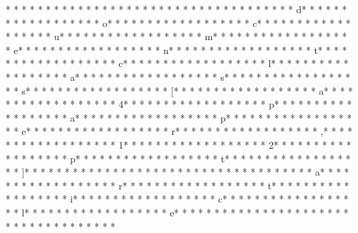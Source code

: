 * * *  * * *  * * *  *  * * *  *  * * *  * 
* * *  * * *  * * *  *  * * *  *  * * *  * d* * *  * * *  * * *  *  * * *  *  * * *  * o* * *  * * *  * * *  *  * * *  *  * * *  * c* * *  * * *  * * *  *  * * *  *  * * *  * u* * *  * * *  * * *  *  * * *  *  * * *  * m* * *  * * *  * * *  *  * * *  *  * * *  * e* * *  * * *  * * *  *  * * *  *  * * *  * n* * *  * * *  * * *  *  * * *  *  * * *  * t* * *  * * *  * * *  *  * * *  *  * * *  * c* * *  * * *  * * *  *  * * *  *  * * *  * l* * *  * * *  * * *  *  * * *  *  * * *  * a* * *  * * *  * * *  *  * * *  *  * * *  * s* * *  * * *  * * *  *  * * *  *  * * *  * s* * *  * * *  * * *  *  * * *  *  * * *  * [* * *  * * *  * * *  *  * * *  *  * * *  * a* * *  * * *  * * *  *  * * *  *  * * *  * 4* * *  * * *  * * *  *  * * *  *  * * *  * p* * *  * * *  * * *  *  * * *  *  * * *  * a* * *  * * *  * * *  *  * * *  *  * * *  * p* * *  * * *  * * *  *  * * *  *  * * *  * e* * *  * * *  * * *  *  * * *  *  * * *  * r* * *  * * *  * * *  *  * * *  *  * * *  * ,* * *  * * *  * * *  *  * * *  *  * * *  * 1* * *  * * *  * * *  *  * * *  *  * * *  * 2* * *  * * *  * * *  *  * * *  *  * * *  * p* * *  * * *  * * *  *  * * *  *  * * *  * t* * *  * * *  * * *  *  * * *  *  * * *  * ]* * *  * * *  * * *  *  * * *  *  * * *  * {* * *  * * *  * * *  *  * * *  *  * * *  * a* * *  * * *  * * *  *  * * *  *  * * *  * r* * *  * * *  * * *  *  * * *  *  * * *  * t* * *  * * *  * * *  *  * * *  *  * * *  * i* * *  * * *  * * *  *  * * *  *  * * *  * c* * *  * * *  * * *  *  * * *  *  * * *  * l* * *  * * *  * * *  *  * * *  *  * * *  * e* * *  * * *  * * *  *  * * *  *  * * *  * }* * *  * * *  * * *  *  * * *  *  * * *  * 
